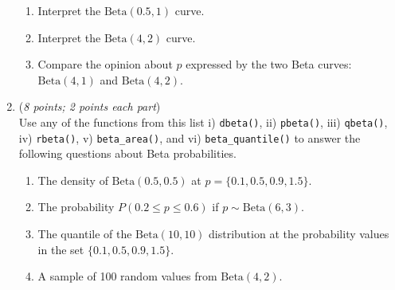 \documentclass[11pt]{article}
\begin{document}
\begin{enumerate}
\begin{enumerate}
\item Interpret the $\textrm{Beta}(0.5, 1)$ curve.

\item Interpret the $\textrm{Beta}(4, 2)$ curve.

\item Compare the opinion about $p$ expressed by the two Beta curves: $\textrm{Beta}(4, 1)$ and $\textrm{Beta}(4, 2)$.
\end{enumerate}

    \item
    ({\it{8 points; 2 points each part}}) \\
    Use any of the functions from this list i) \texttt{dbeta()}, ii) \texttt{pbeta()}, iii) \texttt{qbeta()}, iv) \texttt{rbeta()}, v) \texttt{beta\_area()}, and vi) \texttt{beta\_quantile()} to answer the following questions about Beta probabilities. 

\begin{enumerate}
\item The density of $\textrm{Beta}(0.5, 0.5)$ at $p = \{0.1, 0.5, 0.9, 1.5\}$. 

\item The probability $P(0.2 \le p \le 0.6)$ if $p \sim \textrm{Beta}(6, 3)$.

\item The quantile of the $\textrm{Beta}(10, 10)$ distribution at  the probability values  in the set $ \{0.1, 0.5, 0.9, 1.5\}$.

\item A sample of 100 random values from $\textrm{Beta}(4, 2)$.
\end{enumerate}


%
%
%
%



\end{enumerate}
\end{document}
